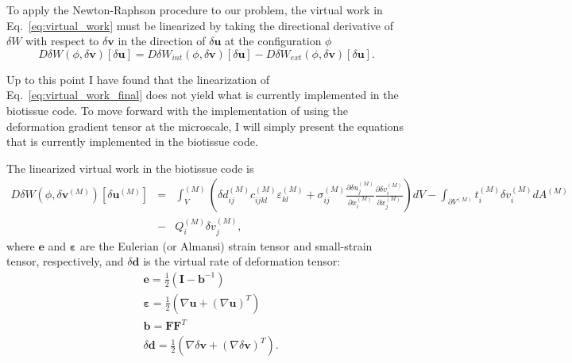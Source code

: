 To apply the Newton-Raphson procedure to our problem, the virtual work in Eq.\ \eqref{eq:virtual_work} must be linearized by taking the directional derivative of $\delta W$ with respect to $\delta \pmb{v}$ in the direction of $\delta \pmb{u}$ at the configuration $\phi$
%
\begin{equation}
D\delta W (\phi,\delta \pmb{v}) [\delta \pmb{u}] = D\delta W_{int} (\phi,\delta \pmb{v}) [\delta \pmb{u}] - D\delta W_{ext} (\phi,\delta \pmb{v}) [\delta \pmb{u}].
\end{equation}
%
%

Up to this point I have found that the linearization of Eq.\ \eqref{eq:virtual_work_final} does not yield what is currently implemented in the biotissue code. To move forward with the implementation of using the deformation gradient tensor at the microscale, I will simply present the equations that is currently implemented in the biotissue code.

The linearized virtual work in the biotissue code is
%
\begin{eqnarray}
D\delta W(\phi,\delta \pmb{v}^{(M)})[\delta \pmb{u}^{(M)}]  
%
&=& \int_V^{(M)} \left(\delta d_{ij}^{(M)} c_{ijkl}^{(M)} \varepsilon_{kl}^{(M)} +  \sigma_{ij}^{(M)} \frac{\partial \delta u_j^{(M)}}{\partial x_i^{(M)}}\frac{\partial \delta v_i^{(M)}}{\partial x_j^{(M)}}\right) d V - \int_{\partial V^{(M)}} t_i^{(M)} \delta v_i^{(M)} dA^{(M)} \nonumber\\
&-& Q_i^{(M)} \delta v_j^{(M)},
\label{eq:virtual_work_linearized}
\end{eqnarray}
%
where $\pmb{e}$ and $\pmb{\varepsilon}$ are the Eulerian (or Almansi) strain tensor and small-strain tensor, respectively, and $\delta \pmb{d}$ is the virtual rate of deformation tensor: 
%
\begin{align}
&\pmb{e} = \frac{1}{2}(\pmb{I} - \pmb{b}^{-1}) \nonumber\\
%
&\pmb{\varepsilon} = \frac{1}{2}\left(\nabla \pmb{u} + (\nabla \pmb{u})^T\right) \nonumber\\
%
&\pmb{b} = \pmb{F}\pmb{F}^T \\
%
&\delta \pmb{d} = \frac{1}{2}\left(\nabla \delta \pmb{v}  + (\nabla \delta \pmb{v})^T\right).
\end{align}
%

